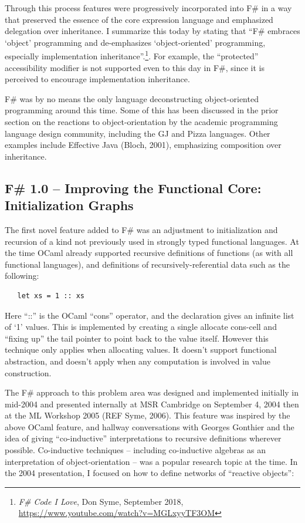 \documentclass[acmsmall]{acmart}\settopmatter{}
\begin{document}
Through this process features were progressively incorporated into F\# in a way that preserved the essence of the core expression language and emphasized delegation over inheritance.  I summarize this today by stating that “F\# embraces ‘object’ programming and de-emphasizes ‘object-oriented’ programming, especially implementation inheritance”.\footnote{\textit{F\# Code I Love}, Don Syme, September 2018, \url{https://www.youtube.com/watch?v=MGLxyyTF3OM}}.  For example, the “protected” accessibility modifier is not supported even to this day in F\#, since it is perceived to encourage implementation inheritance.

F\# was by no means the only language deconstructing object-oriented programming around this time. Some of this has been discussed in the prior section on the reactions to object-orientation by the academic programming language design community, including the GJ and Pizza languages. Other examples include Effective Java (Bloch, 2001), emphasizing composition over inheritance.


\subsection*{F\# 1.0 – Improving the Functional Core: Initialization Graphs}

The first novel feature added to F\# was an adjustment to initialization and recursion of a kind not previously used in strongly typed functional languages. At the time OCaml already supported recursive definitions of functions (as with all functional languages), and definitions of recursively-referential data such as the following:
\begin{verbatim}
   let xs = 1 :: xs
\end{verbatim}

Here “::” is the OCaml “cons” operator, and the declaration gives an infinite list of ‘1’ values. This is implemented by creating a single allocate cons-cell and “fixing up” the tail pointer to point back to the value itself.  However this technique only applies when allocating values.  It doesn’t support functional abstraction, and doesn’t apply when any computation is involved in value construction.

The F\# approach to this problem area was designed and implemented initially in mid-2004 and presented internally at MSR Cambridge on September 4, 2004 then at the ML Workshop 2005 (REF Syme, 2006). This feature was inspired by the above OCaml feature, and hallway conversations with Georges Gonthier and the idea of giving “co-inductive” interpretations to recursive definitions wherever possible.  Co-inductive techniques – including co-inductive algebras as an interpretation of object-orientation – was a popular research topic at the time. In the 2004 presentation, I focused on how to define networks of “reactive objects”: 
\end{document}

